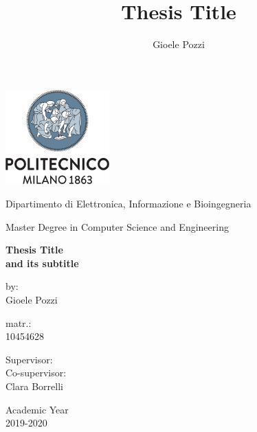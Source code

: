 \documentclass[oneside]{book}
\author{Gioele Pozzi}
\title{Thesis Title}
\begin{document}
\centering
\includegraphics[width=4cm]{../pictures/logo_archetype_vertical}

\vspace{1cm}
Dipartimento di Elettronica, Informazione e Bioingegneria

\vspace{0.25cm}
Master Degree in Computer Science and Engineering

\vspace{2cm}
\centering

\color{BrickRed}
\Huge
\textbf{
Thesis Title \\%
\Large and its subtitle}

\normalsize
\vspace{2cm}
\color{black}
\flushright
by:\\Gioele Pozzi

\vspace{0.5cm}
matr.:\\10454628

\vspace{0.5cm}
\flushleft
Supervisor:\\

\vspace{0.5cm}
Co-supervisor:\\ Clara Borrelli



\vfill
\centering
Academic Year \\ 2019-2020

\end{document}
